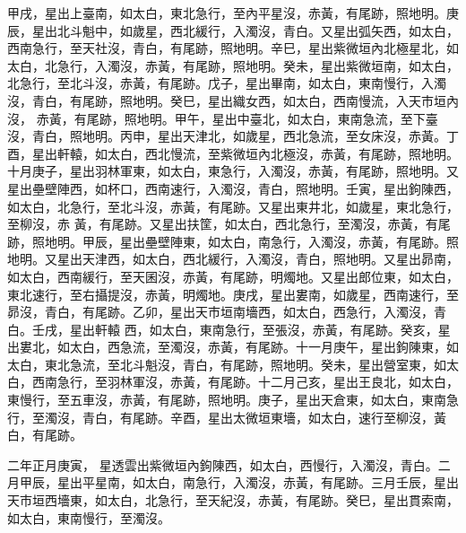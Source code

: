 \begin{pinyinscope}
 甲戌，星出上臺南，如太白，東北急行，至內平星沒，赤黃，有尾跡，照地明。庚辰，星出北斗魁中，如歲星，西北緩行，入濁沒，青白。又星出弧矢西，如太白，西南急行，至天社沒，青白，有尾跡，照地明。辛巳，星出紫微垣內北極星北，如太白，北急行，入濁沒，赤黃，有尾跡，照地明。癸未，星出紫微垣南，如太白，北急行，至北斗沒，赤黃，有尾跡。戊子，星出畢南，如太白，東南慢行，入濁沒，青白，有尾跡，照地明。癸巳，星出織女西，如太白，西南慢流，入天市垣內沒，
 赤黃，有尾跡，照地明。甲午，星出中臺北，如太白，東南急流，至下臺沒，青白，照地明。丙申，星出天津北，如歲星，西北急流，至女床沒，赤黃。丁酉，星出軒轅，如太白，西北慢流，至紫微垣內北極沒，赤黃，有尾跡，照地明。十月庚子，星出羽林軍東，如太白，東急行，入濁沒，赤黃，有尾跡，照地明。又星出壘壁陣西，如杯口，西南速行，入濁沒，青白，照地明。壬寅，星出鉤陳西，如太白，北急行，至北斗沒，赤黃，有尾跡。又星出東井北，如歲星，東北急行，至柳沒，赤
 黃，有尾跡。又星出扶筐，如太白，西北急行，至濁沒，赤黃，有尾跡，照地明。甲辰，星出壘壁陣東，如太白，南急行，入濁沒，赤黃，有尾跡。照地明。又星出天津西，如太白，西北緩行，入濁沒，青白，照地明。又星出昴南，如太白，西南緩行，至天囷沒，赤黃，有尾跡，明燭地。又星出郎位東，如太白，東北速行，至右攝提沒，赤黃，明燭地。庚戌，星出婁南，如歲星，西南速行，至昴沒，青白，有尾跡。乙卯，星出天市垣南墻西，如太白，西急行，入濁沒，青白。壬戌，星出軒轅
 西，如太白，東南急行，至張沒，赤黃，有尾跡。癸亥，星出婁北，如太白，西急流，至濁沒，赤黃，有尾跡。十一月庚午，星出鉤陳東，如太白，東北急流，至北斗魁沒，青白，有尾跡，照地明。癸未，星出營室東，如太白，西南急行，至羽林軍沒，赤黃，有尾跡。十二月己亥，星出王良北，如太白，東慢行，至五車沒，赤黃，有尾跡，照地明。庚子，星出天倉東，如太白，東南急行，至濁沒，青白，有尾跡。辛酉，星出太微垣東墻，如太白，速行至柳沒，黃白，有尾跡。



 二年正月庚寅，
 星透雲出紫微垣內鉤陳西，如太白，西慢行，入濁沒，青白。二月甲辰，星出平星南，如太白，南急行，入濁沒，赤黃，有尾跡。三月壬辰，星出天市垣西墻東，如太白，北急行，至天紀沒，赤黃，有尾跡。癸巳，星出貫索南，如太白，東南慢行，至濁沒。




\end{pinyinscope}
